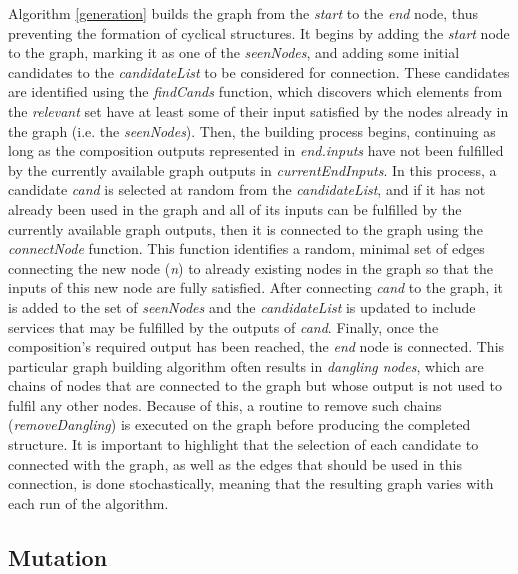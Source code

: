 \documentclass{article}
\begin{document}
Algorithm \ref{generation} builds the graph from the \textit{start} to the \textit{end} node, thus preventing the formation of cyclical
structures. It begins by adding the \textit{start} node to the graph, marking it as one of the
\textit{seenNodes}, and adding some initial candidates to the \textit{candidateList} to be considered for connection. These candidates
are identified using the \textit{findCands} function, which discovers which elements from the \textit{relevant} set have at least some
of their input satisfied by the nodes already in the graph (i.e. the \textit{seenNodes}). Then, the building process begins, continuing
as long as the composition outputs represented in \textit{end.inputs} have not been fulfilled by the currently available graph outputs
in \textit{currentEndInputs}. In this process, a candidate \textit{cand} is selected at random from the \textit{candidateList}, and if
it has not already been used in the graph and all of its inputs can be fulfilled by the currently available graph outputs, then it is
connected to the graph using the \textit{connectNode} function. This function identifies a random, minimal set of edges connecting the
new node (\textit{n}) to already existing nodes in the graph so that the inputs of this new node are fully satisfied. After connecting
\textit{cand} to the graph, it is added to the set of \textit{seenNodes} and the \textit{candidateList} is updated to include services
that may be fulfilled by the outputs of \textit{cand}. Finally, once the composition's required output has been reached, the \textit{end}
node is connected. This particular graph building algorithm often results in \textit{dangling nodes}, which are chains of nodes that are
connected to the graph but whose output is not used to fulfil any other nodes. Because of this, a routine to remove such chains (\textit{removeDangling})
is executed on the graph before producing the completed structure. It is important to highlight that the selection of each candidate
to connected with the graph, as well as the edges that should be used in this connection, is done stochastically, meaning that the
resulting graph varies with each run of the algorithm.

\subsection{Mutation}
\end{document}
